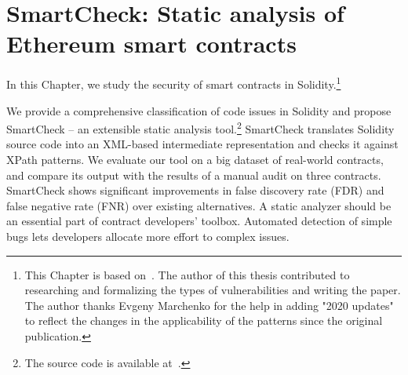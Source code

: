 \chapter{SmartCheck: Static analysis of Ethereum smart contracts}

\label{Chapter11SmartCheck}



In this Chapter, we study the security of smart contracts in Solidity.\footnote{This Chapter is based on~\cite{Tikhomirov2018}. The author of this thesis contributed to researching and formalizing the types of vulnerabilities and writing the paper. The author thanks Evgeny Marchenko for the help in adding "2020 updates" to reflect the changes in the applicability of the patterns since the original publication.}

We provide a comprehensive classification of code issues in Solidity and propose SmartCheck -- an extensible static analysis tool.\footnote{The source code is available at~\cite{SmartCheck}.}
SmartCheck translates Solidity source code into an XML-based intermediate representation and checks it against XPath patterns.
We evaluate our tool on a big dataset of real-world contracts, and compare its output with the results of a manual audit on three contracts.
SmartCheck shows significant improvements in false discovery rate (FDR) and false negative rate (FNR) over existing alternatives.
A static analyzer should be an essential part of contract developers' toolbox.
Automated detection of simple bugs lets developers allocate more effort to complex issues.










